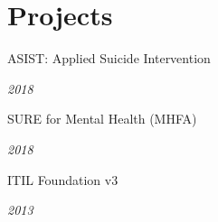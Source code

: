 \section{Projects}

\parbox[t][][t]{\linewidth}{
	\parbox{\linewidth}{ASIST: Applied Suicide Intervention}
	\smallbreak
	\parbox{\linewidth}{{\textit{2018}}}
}

\parbox[t][][t]{\linewidth}{
	\parbox{\linewidth}{SURE for Mental Health (MHFA)}
	\smallbreak
	\parbox{\linewidth}{{\textit{2018}}}
}

\parbox[t][][t]{\linewidth}{
	\parbox{\linewidth}{ITIL Foundation v3}
	\smallbreak
	\parbox{\linewidth}{{\textit{2013}}}
}